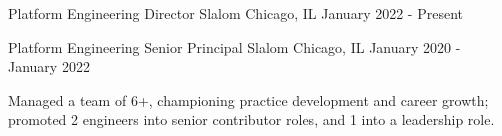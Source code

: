 

\begin{cventries}

  \cventry
    {Platform Engineering Director} %
    {Slalom} %
    {Chicago, IL} %
    {January 2022 - Present} %
    {
      \begin{cvitems} %
      \end{cvitems}
    }

  \cventry
    {Platform Engineering Senior Principal} %
    {Slalom} %
    {Chicago, IL} %
    {January 2020 - January 2022} %
    {
      \begin{cvitems} %
        \item {Managed a team of 6+, championing practice development and career growth; promoted 2 engineers into senior contributor roles, and 1 into a leadership role.}
      \end{cvitems}
    }


\end{cventries}
